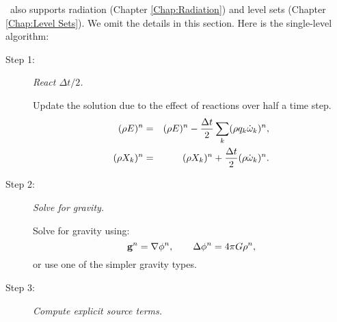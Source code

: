 \castro\ also supports radiation (Chapter \ref{Chap:Radiation}) and
level sets (Chapter \ref{Chap:Level Sets}).  We omit the details in
this section.  Here is the single-level algorithm:
\begin{description}
\item[Step 1:] {\em React $\Delta t/2$.}

Update the solution due to the effect of reactions over half a time step.
\begin{eqnarray}
(\rho E)^n &=& (\rho E)^n - \frac{\Delta t}{2}\sum_k(\rho q_k\dot\omega_k)^n,\\
(\rho X_k)^n &=& (\rho X_k)^n + \frac{\Delta t}{2}(\rho\dot\omega_k)^n.
\end{eqnarray}
\item[Step 2:] {\em Solve for gravity.}

Solve for gravity using:
\begin{equation}
{\bf g}^n = \nabla\phi^n, \qquad 
\Delta\phi^n = 4\pi G\rho^n,
\end{equation}
or use one of the simpler gravity types.

\item[Step 3:] {\em Compute explicit source terms.}


\end{description}
